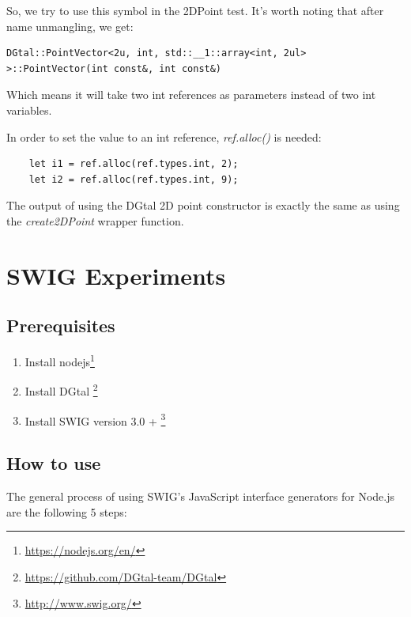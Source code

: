 So, we try to use this symbol in the 2DPoint test. It's worth noting
that after name unmangling, we get:
    \begin{lstlisting}
DGtal::PointVector<2u, int, std::__1::array<int, 2ul> >::PointVector(int const&, int const&)
    \end{lstlisting}

Which means it will take two int references as parameters instead of two int variables.

In order to set the value to an int reference, \textit{ref.alloc()} is needed:
    \begin{lstlisting}
    let i1 = ref.alloc(ref.types.int, 2);
    let i2 = ref.alloc(ref.types.int, 9);
    \end{lstlisting}

The output of using the DGtal 2D point constructor is exactly the same as using the \textit{create2DPoint} wrapper function.

     
          
\section{SWIG Experiments}

\subsection{Prerequisites}
    \begin{enumerate}
        \item Install nodejs\footnote{\url{https://nodejs.org/en/}}
        \item Install DGtal \footnote{\url{https://github.com/DGtal-team/DGtal}}
        \item Install SWIG version 3.0 + \footnote{\url{http://www.swig.org/}}
    \end{enumerate}


\subsection{How to use}
The general process of using SWIG's JavaScript interface generators for Node.js are the following 5 steps:

